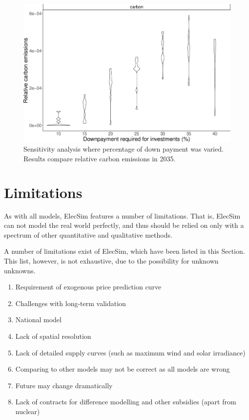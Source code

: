 \begin{figure}
	\centering
	\includegraphics[width=0.9\linewidth]{Chapter4/figures/sensitvity_analysis/downpayment_carbon_sensitivity_analysis.pdf}
	\caption{Sensitivity analysis where percentage of down payment was varied. Results compare relative carbon emissions in 2035.}
	\label{elecsim:fig:downpayment_carbon_sensitivity}
\end{figure}


\section{Limitations}
\label{elecsim:sec:limitations}

As with all models, ElecSim features a number of limitations. That is, ElecSim can not model the real world perfectly, and thus should be relied on only with a spectrum of other quantitative and qualitative methods.

A number of limitations exist of ElecSim, which have been listed in this Section. This list, however, is not exhaustive, due to the possibility for unknown unknowns.

\begin{enumerate}
	\item Requirement of exogenous price prediction curve
	\item Challenges with long-term validation
	\item National model
	\item Lack of spatial resolution
	\item Lack of detailed supply curves (such as maximum wind and solar irradiance)
	\item Comparing to other models may not be correct as all models are wrong
	\item Future may change dramatically
	\item Lack of contracts for difference modelling and other subsidies (apart from nuclear)
\end{enumerate}

